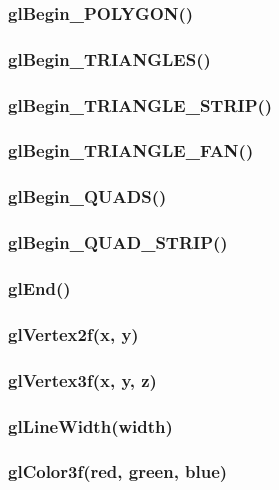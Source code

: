 \documentclass[11pt,parskip=half,a4paper]{scrartcl}
\begin{document}
\subsubsection{glBegin\_POLYGON()}

\subsubsection{glBegin\_TRIANGLES()}

\subsubsection{glBegin\_TRIANGLE\_STRIP()}

\subsubsection{glBegin\_TRIANGLE\_FAN()}

\subsubsection{glBegin\_QUADS()}

\subsubsection{glBegin\_QUAD\_STRIP()}

\subsubsection{glEnd()}

\subsubsection{glVertex2f(x, y)}

\subsubsection{glVertex3f(x, y, z)}

\newpage

\subsubsection{glLineWidth(width)}

\subsubsection{glColor3f(red, green, blue)}
\end{document}
